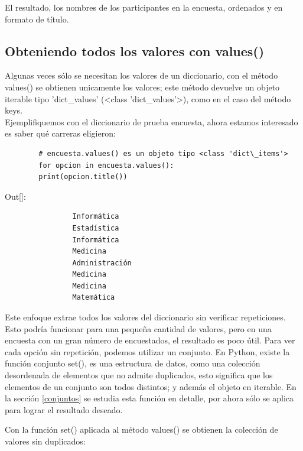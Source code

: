 	\noindent El resultado,  los nombres de los participantes en la encuesta, ordenados y en formato de título.
	
	
	\subsection{Obteniendo todos los valores con {\ttfamily values()}} 
	
	Algunas veces sólo se necesitan los valores de un diccionario, con el método {\ttfamily values()} se obtienen unicamente los valores; este método  devuelve un objeto iterable tipo {\ttfamily{}'{}dict\_values{}'{}} ({\ttfamily <class {}'{}dict\_values{}'{}>{}}), como en el caso del método {\ttfamily keys}.\\
	
	Ejemplifiquemos con el diccionario de prueba {\ttfamily encuesta}, ahora estamos interesado es saber qué carreras eligieron: 
	
	\hspace{-2.5cm}{\ttfamily\scriptsize carreras.py}\vspace{-0.5cm}
	\begin{lstlisting}
		# encuesta.values() es un objeto tipo <class 'dict\_items'>
		for opcion in encuesta.values():
		print(opcion.title())
	\end{lstlisting}
	{\ttfamily\scriptsize\scriptsize 
		\noindent Out[]: \vspace{-0.3cm}	
		{\color{blue} 	
			\begin{verbatim}
				Informática
				Estadística
				Informática
				Medicina
				Administración
				Medicina
				Medicina
				Matemática
			\end{verbatim}
	}}
	
	Este enfoque extrae todos los valores del diccionario sin verificar repeticiones. Esto podría funcionar para una pequeña cantidad de valores, pero en una encuesta con un gran número de encuestados, el resultado es poco útil. Para ver cada opción sin repetición, podemos utilizar un conjunto. En Python, existe la función conjunto  {\ttfamily set()},  es una estructura de datos, como una colección desordenada de elementos que no admite duplicados, esto significa que los elementos de un conjunto son todos distintos; y además el objeto en iterable. En la sección \ref{conjuntos} se estudia esta función en detalle, por ahora sólo se aplica para lograr el resultado deseado. 
	
	Con la función {\ttfamily set()} aplicada al método {\ttfamily values()} se obtienen la colección de  valores sin duplicados:
	
